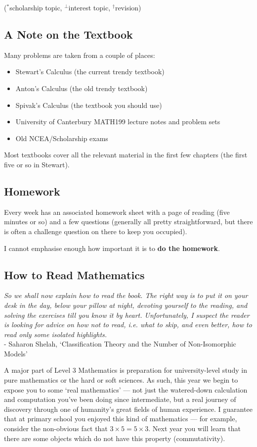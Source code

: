 ($^*$scholarship topic, $^\perp$interest topic, $^\dagger$revision)

\subsection*{A Note on the Textbook}
Many problems are taken from a couple of places:
\begin{itemize}
  \item Stewart's Calculus (the current trendy textbook)
  \item Anton's Calculus (the old trendy textbook)
  \item Spivak's Calculus (the textbook you should use)
  \item University of Canterbury MATH199 lecture notes and problem sets
  \item Old NCEA/Scholarship exams
\end{itemize}
Most textbooks cover all the relevant material in the first few chapters (the first five or so in Stewart).

\subsection*{Homework}
Every week has an associated homework sheet with a page of reading (five minutes or so) and a few questions (generally all
pretty straightforward, but there is often a challenge question on there to keep you occupied).

I cannot emphasise enough how important it is to \textbf{do the homework}.

\subsection*{How to Read Mathematics}
\begin{center}
  \textit{So we shall now explain how to read the book. The right way is to put it on your desk in the day, below your pillow at night, devoting yourself to the reading, and solving the exercises till you know it by heart. Unfortunately, I suspect the reader is looking for advice on how not to read, i.e. what to skip, and even better, how to read only some isolated highlights.}\\ - Saharon Shelah, `Classification Theory and the Number of Non-Isomorphic Models'
\end{center}

A major part of Level 3 Mathematics is preparation for university-level study in pure mathematics or the hard or soft sciences. As such, this
year we begin to expose you to some `real mathematics' --- not just the watered-down calculation and computation you've been doing since intermediate,
but a real journey of discovery through one of humanity's great fields of human experience. I guarantee that at primary school you enjoyed
this kind of mathematics --- for example, consider the non-obvious fact that $ 3 \times 5 = 5 \times 3 $. Next year you will learn that there are
some objects which do not have this property (commutativity).

